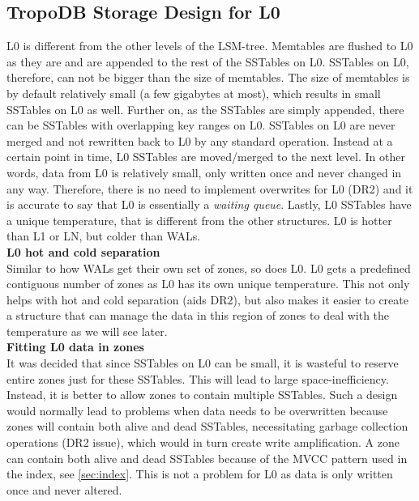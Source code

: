 \subsection{TropoDB Storage Design for L0}
\label{sec:l0}
L0 is different from the other levels of the LSM-tree. Memtables are flushed to L0 as they are and are appended to the rest of the SSTables on L0. SSTables on L0, therefore, can not be bigger than the size of memtables. The size of memtables is by default relatively small (a few gigabytes at most), which results in small SSTables on L0 as well. Further on, as the SSTables are simply appended, there can be SSTables with overlapping key ranges on L0. SSTables on L0 are never merged and not rewritten back to L0 by any standard operation. Instead at a certain point in time, L0 SSTables are moved/merged to the next level. In other words, data from L0 is relatively small, only written once and never changed in any way. Therefore, there is no need to implement overwrites for L0 (DR2) and it is accurate to say that L0 is essentially a \textit{waiting queue}. Lastly, L0 SSTables have a unique temperature, that is different from the other structures. L0 is hotter than L1 or LN, but colder than WALs.\\
\textbf{L0 hot and cold separation}\\
Similar to how WALs get their own set of zones, so does L0. L0 gets a predefined contiguous number of zones as L0 has its own unique temperature. This not only helps with hot and cold separation (aids DR2), but also makes it easier to create a structure that can manage the data in this region of zones to deal with the temperature as we will see later.\\
\textbf{Fitting L0 data in zones}\\
It was decided that since SSTables on L0 can be small, it is wasteful to reserve entire zones just for these SSTables. This will lead to large space-inefficiency. Instead, it is better to allow zones to contain multiple SSTables. Such a design would normally lead to problems when data needs to be overwritten because zones will contain both alive and dead SSTables, necessitating garbage collection operations (DR2 issue), which would in turn create write amplification. A zone can contain both alive and dead SSTables because of the MVCC pattern used in the index, see \autoref{sec:index}. This is not a problem for L0 as data is only written once and never altered.

